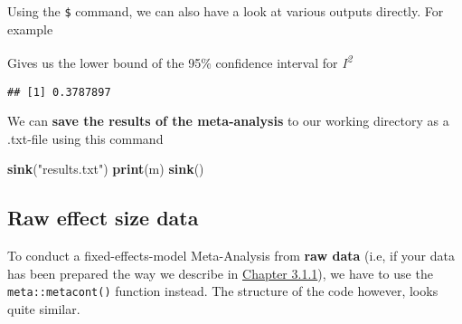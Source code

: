 \documentclass[]{book}
\newenvironment{Shaded}{\begin{snugshade}}{\end{snugshade}}
\newcommand{\KeywordTok}[1]{\textcolor[rgb]{0.13,0.29,0.53}{\textbf{#1}}}
\newcommand{\StringTok}[1]{\textcolor[rgb]{0.31,0.60,0.02}{#1}}
\newcommand{\OperatorTok}[1]{\textcolor[rgb]{0.81,0.36,0.00}{\textbf{#1}}}
\newcommand{\NormalTok}[1]{#1}
\theoremstyle{definition}
\theoremstyle{definition}
\theoremstyle{definition}
\theoremstyle{remark}
\begin{document}
Using the \texttt{\$} command, we can also have a look at various
outputs directly. For example

\begin{Shaded}
\end{Shaded}

Gives us the lower bound of the 95\% confidence interval for
\emph{I\textsuperscript{2}}

\begin{verbatim}
## [1] 0.3787897
\end{verbatim}

We can \textbf{save the results of the meta-analysis} to our working
directory as a .txt-file using this command

\begin{Shaded}
\begin{Highlighting}[]
\KeywordTok{sink}\NormalTok{(}\StringTok{"results.txt"}\NormalTok{)}
\KeywordTok{print}\NormalTok{(m)}
\KeywordTok{sink}\NormalTok{()}
\end{Highlighting}
\end{Shaded}

\subsection{Raw effect size data}\label{fixed.raw}

To conduct a fixed-effects-model Meta-Analysis from \textbf{raw data}
(i.e, if your data has been prepared the way we describe in
\protect\hyperlink{excel_preparation}{Chapter 3.1.1}), we have to use
the \texttt{meta::metacont()} function instead. The structure of the
code however, looks quite similar.
\end{document}
